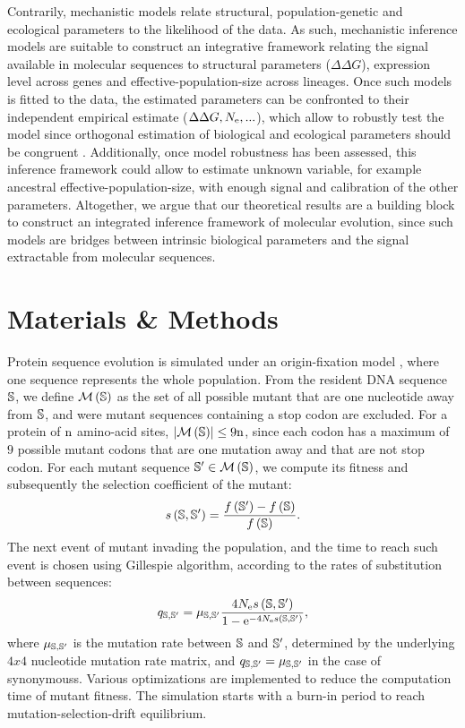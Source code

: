 Contrarily, mechanistic models relate structural, population-genetic and ecological parameters to the \gls{likelihood} of the data.
As such, mechanistic inference models are suitable to construct an integrative framework relating the signal available in molecular sequences to structural parameters ($\Delta \Delta G$), expression level across genes and \gls{effective-population-size} across lineages.
Once such models is fitted to the data, the estimated parameters can be confronted to their independent empirical estimate ($\Delta \Delta G, N_{\mathrm{e}}, ...$), which allow to robustly test the model since orthogonal estimation of biological and ecological parameters should be congruent \cite{Dasmeh2014}. 
Additionally, once model robustness has been assessed, this inference framework could allow to estimate unknown variable, for example ancestral \gls{effective-population-size}, with enough signal and calibration of the other parameters. 
Altogether, we argue that our theoretical results are a building block to construct an integrated inference framework of molecular evolution, since such models are bridges between intrinsic biological parameters and the signal extractable from molecular sequences.

\section{Materials \& Methods}
Protein sequence evolution is simulated under an origin-fixation model \citep{McCandlish2014}, where one sequence represents the whole population.
From the resident \acrshort{DNA} sequence $\mathbb{S}$, we define $\mathcal{M}\left(\mathbb{S}\right)$ as the set of all possible mutant that are one nucleotide away from $\mathbb{S}$, and were mutant sequences containing a stop \gls{codon} are excluded.
For a protein of $\text{n}$ amino-acid sites, $\left| \mathcal{M}\left(\mathbb{S}\right) \right| \leq 9 \text{n}$, since each \gls{codon} has a maximum of $9$ possible mutant \glspl{codon} that are one mutation away and that are not stop \gls{codon}.
For each mutant sequence $\mathbb{S}' \in \mathcal{M}\left(\mathbb{S}\right)$, we compute its fitness and subsequently the selection coefficient of the mutant:
\begin{equation}
s \left( \mathbb{S},\mathbb{S}'\right) = \dfrac{ f \left(\mathbb{S}' \right) - f \left(\mathbb{S}\right) }{f\left( \mathbb{S}\right)}.
\end{equation}
The next event of mutant invading the population, and the time to reach such event is chosen using Gillespie algorithm, according to the rates of \gls{substitution} between sequences:
\begin{equation}
q_{\mathbb{S}, \mathbb{S}'} = \mu_{\mathbb{S}, \mathbb{S}'} \dfrac{4 N_{\mathrm{e}} s \left( \mathbb{S},\mathbb{S}'\right)}{1 - \mathrm{e}^{-4 N_{\mathrm{e}} s \left( \mathbb{S},\mathbb{S}'\right)}}, 
\end{equation}
where $\mu_{\mathbb{S}, \mathbb{S}'}$ is the mutation rate between $\mathbb{S}$ and $\mathbb{S}'$, determined by the underlying $4x4$ nucleotide mutation rate matrix, and ${q_{\mathbb{S}, \mathbb{S}'}} = \mu_{\mathbb{S}, \mathbb{S}'}$ in the case of \glspl{synonymous}.
Various optimizations are implemented to reduce the computation time of mutant fitness.
The simulation starts with a burn-in period to reach mutation-selection-drift equilibrium.

